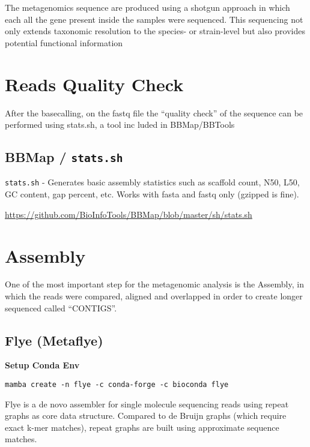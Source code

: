 \documentclass[
]{book}
\begin{document}
The metagenomics sequence are produced using a shotgun approach in which each all the gene present inside the samples were sequenced. This sequencing not only extends taxonomic resolution to the species- or strain-level but also provides potential functional information

\section{Reads Quality Check}\label{reads-quality-check}

After the basecalling, on the fastq file the ``quality check'' of the sequence can be performed using stats.sh, a tool inc
luded in BBMap/BBTools

\subsection{\texorpdfstring{BBMap / \texttt{stats.sh}}{BBMap / stats.sh}}\label{bbmap-stats.sh}

\texttt{stats.sh} - Generates basic assembly statistics such as scaffold count, N50, L50, GC content, gap percent, etc. Works with fasta and fastq only (gzipped is fine).

\url{https://github.com/BioInfoTools/BBMap/blob/master/sh/stats.sh}

\section{Assembly}\label{assembly}

One of the most important step for the metagenomic analysis is the Assembly, in which the reads were compared, aligned and overlapped in order to create longer sequenced called ``CONTIGS''.

\subsection{Flye (Metaflye)}\label{flye-metaflye}

\textbf{Setup Conda Env}

\begin{verbatim}
mamba create -n flye -c conda-forge -c bioconda flye
\end{verbatim}

Flye is a de novo assembler for single molecule sequencing reads using repeat graphs as core data structure. Compared to de Bruijn graphs (which require exact k-mer matches), repeat graphs are built using approximate sequence matches.
\end{document}

